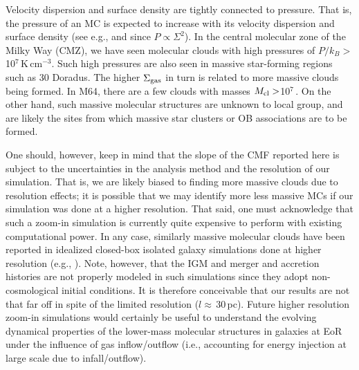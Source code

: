 \IfFileExists{emulateapjlegacy.cls}{\documentclass[iop]{emulateapjlegacy}}{\documentclass[iop]{emulateapj}}
\begin{document}
Velocity dispersion and surface density are tightly connected to pressure. 
That is, the pressure of an MC is expected to increase with its velocity dispersion and surface density (see e.g.,  and 
since $P\propto\Sigma^2$).
In the central molecular zone of the Milky Way (CMZ), we have seen molecular clouds with high pressures of 
$P/k_B > $10$^7$\,K\,cm$^{-3}$. Such high pressures are also seen in massive star-forming regions such as 30 Doradus.
The higher $\Sigma_{\rm gas}$ in turn is related to more massive clouds being formed.
In M64, there are a few clouds with masses $M_{\rm cl}>$10$^7$\,\Msun. 
On the other hand, such massive molecular structures are unknown to local group, and are likely the sites 
from which massive star clusters or OB associations are to be formed.


One should, however, keep in mind that 
the slope of the CMF reported here is subject
to the uncertainties in the analysis method and the resolution of our simulation. 
That is, we are likely biased to finding more massive clouds due to resolution effects; 
it is possible that we may identify more less massive MCs if our simulation 
was done at a higher resolution. 
That said, one must acknowledge that such a zoom-in simulation is currently quite expensive to perform with 
existing computational power.
In any case, similarly massive molecular clouds have been reported in idealized closed-box isolated galaxy 
simulations done at higher resolution (e.g., \citealt{Behrendt16a}). 
Note, however, that the IGM and merger and accretion histories are not properly modeled in such simulations 
since they adopt non-cosmological initial conditions. 
It is therefore conceivable that our results are not that far off in spite of the limited resolution ($l\approx$\,30\,pc).
Future higher resolution zoom-in simulations would certainly be useful to understand
the evolving dynamical properties of the lower-mass molecular structures in
galaxies at EoR under the influence of gas inflow/outflow (i.e., accounting for energy injection at large scale due to infall/outflow).
% 




\end{document}
